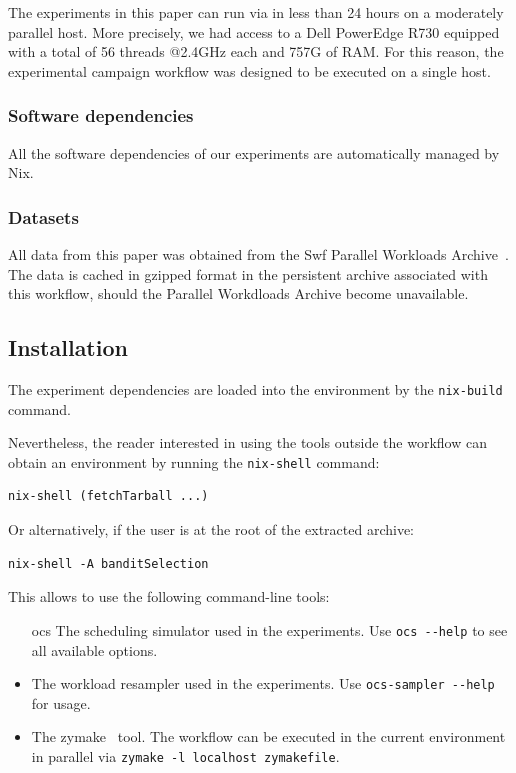 \documentclass[sigconf]{acmart}
\begin{document}
 The experiments in this paper can run via in less than 24 hours on a
 moderately parallel host. More precisely, we had access to a Dell PowerEdge
 R730 equipped with a total of 56 threads @2.4GHz each and 757G of RAM. For
 this reason, the experimental campaign workflow was designed to be executed on
 a single host.

\subsubsection{Software dependencies}

All the software dependencies of our experiments are automatically managed by Nix.

\subsubsection{Datasets}

All data from this paper was obtained from the Swf Parallel Workloads
Archive~\cite{Feitelson20142967}. The data is cached in gzipped format in the
persistent archive associated with this workflow, should the Parallel
Workdloads Archive become unavailable.

\subsection{Installation}

The experiment dependencies are loaded into the environment by the
\lstinline[basicstyle=\ttfamily]|nix-build| command.

Nevertheless, the reader interested in using the tools outside the workflow can
obtain an environment by running the
\lstinline[basicstyle=\ttfamily]|nix-shell| command:

\begin{lstlisting}
nix-shell (fetchTarball ...)
\end{lstlisting}

Or alternatively, if the user is at the root of the extracted archive:

\begin{lstlisting}
nix-shell -A banditSelection
\end{lstlisting}

This allows to use the following command-line tools:

\begin{itemize}

  \item[ocs] The scheduling simulator used in the experiments. Use
    \lstinline[basicstyle=\ttfamily]|ocs --help| to see all available options.

  \item[ocs-sampler] The workload resampler used in the experiments. Use
    \lstinline[basicstyle=\ttfamily]|ocs-sampler --help| for usage.

  \item[zymake] The zymake~\cite{zymake} tool.
    The workflow can be executed in the current environment in parallel
    via \lstinline[basicstyle=\ttfamily]|zymake -l localhost zymakefile|.

\end{itemize}
\end{document}
